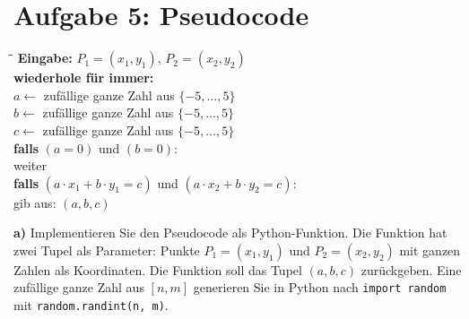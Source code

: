 
\section*{Aufgabe 5: Pseudocode}


\begin{tcolorbox}[title=Pseudocode]
\begin{tabbing}
\hspace{1.5em}\=\hspace{1.5em}\=\kill
\textbf{Eingabe:} $P_1 = (x_1, y_1)$, $P_2 = (x_2, y_2)$ \quad {}\\[1mm]
\textbf{wiederhole für immer:}\\[1mm]
\>$a \leftarrow$ zufällige ganze Zahl aus $\{-5,\ldots,5\}$\\[1mm]
\>$b \leftarrow$ zufällige ganze Zahl aus $\{-5,\ldots,5\}$\\[1mm]
\>$c \leftarrow$ zufällige ganze Zahl aus $\{-5,\ldots,5\}$\\[1mm]
\>\textbf{falls} $(a = 0)$ und $(b = 0)$:\\[1mm]
\>\>weiter \quad {}\\[1mm]
\>\textbf{falls} $(a \cdot x_1 + b \cdot y_1 = c)$ und $(a \cdot x_2 + b \cdot y_2 = c)$:\\[1mm]
\>\>gib aus: $(a, b, c)$
\end{tabbing}
\end{tcolorbox}
\medskip

\noindent \textbf{a)} Implementieren Sie den Pseudocode als Python-Funktion. Die Funktion hat zwei Tupel als Parameter: Punkte $P_1 = (x_1, y_1)$ und $P_2 = (x_2, y_2)$ mit ganzen Zahlen als Koordinaten. Die Funktion soll das Tupel $(a,b,c)$ zurückgeben. Eine zufällige ganze Zahl aus $[n, m]$ generieren Sie in Python nach \texttt{import random} mit \texttt{random.randint(n, m)}.

